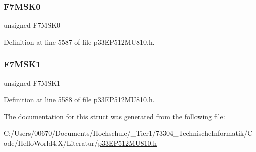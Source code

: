 \subsubsection{\texorpdfstring{F7\+M\+S\+K0}{F7MSK0}}
{\footnotesize\ttfamily unsigned F7\+M\+S\+K0}



Definition at line 5587 of file p33\+E\+P512\+M\+U810.\+h.

\mbox{\label{structtag_c2_f_m_s_k_s_e_l1_b_i_t_s_a09603fe5f0ffe52b1ab15fea39319ab2}} 
\subsubsection{\texorpdfstring{F7\+M\+S\+K1}{F7MSK1}}
{\footnotesize\ttfamily unsigned F7\+M\+S\+K1}



Definition at line 5588 of file p33\+E\+P512\+M\+U810.\+h.



The documentation for this struct was generated from the following file\+:\begin{DoxyCompactItemize}
\item 
C\+:/\+Users/00670/\+Documents/\+Hochschule/\+\_\+\+Tier1/73304\+\_\+\+Technische\+Informatik/\+Code/\+Hello\+World4.\+X/\+Literatur/\hyperlink{p33_e_p512_m_u810_8h}{p33\+E\+P512\+M\+U810.\+h}\end{DoxyCompactItemize}

